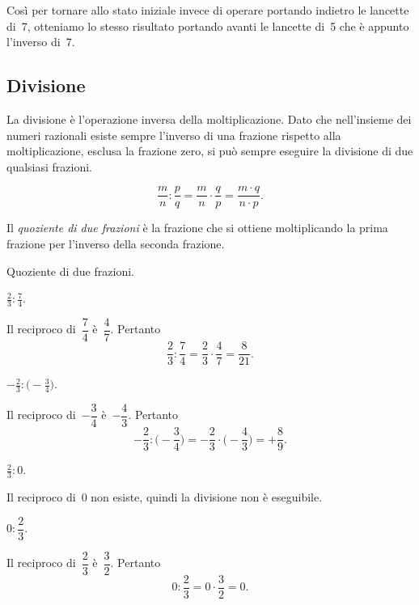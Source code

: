 Così per tornare allo stato iniziale invece di operare portando indietro le lancette di~7,
otteniamo lo stesso risultato portando avanti le lancette di~5 che è appunto l'inverso di~7.

\subsection{Divisione}

La divisione è l'operazione inversa della moltiplicazione.
Dato che nell'insieme dei numeri razionali esiste sempre l'inverso di una frazione rispetto
alla moltiplicazione, esclusa la frazione zero, si può sempre eseguire la divisione di due qualsiasi frazioni.

\begin{center}
 
\end{center}

\[\frac{m}{n}:\frac{p}{q}=\frac{m}{n}\cdot\frac{q}{p}=\frac{m\cdot q}{n\cdot p}.\]

\begin{definizione}
Il \emph{quoziente di due frazioni} è la frazione che si ottiene moltiplicando la prima frazione per l'inverso
della seconda frazione.
\end{definizione}

\begin{exrig}
 \begin{esempio}
Quoziente di due frazioni.
\begin{itemize*}
\item $\displaystyle{\frac{2}{3}:\frac{7}{4}}$.
\end{itemize*}
Il reciproco di~$\dfrac{7}{4}$ è~$\dfrac{4}{7}$. Pertanto
\[\frac{2}{3}:\frac{7}{4}=\frac{2}{3}\cdot\frac{4}{7}=\frac{8}{21}.\]

\begin{itemize*}
	\item $\displaystyle{-\frac{2}{3}:\bigg(-\frac{3}{4}\bigg)}$.
\end{itemize*}
Il reciproco di~$-\dfrac{3}{4}$ è~$-\dfrac{4}{3}$. Pertanto
\[-\frac{2}{3}:\bigg(-\frac{3}{4}\bigg)=-\frac{2}{3}\cdot\bigg(-\frac{4}{3}\bigg)=+\frac{8}{9}.\]

\begin{itemize*}
 \item $\displaystyle{\frac{2}{3}:0}$.
\end{itemize*}
 Il reciproco di~0 non esiste, quindi la divisione non è eseguibile.

\begin{itemize*}
 \item $0:\dfrac{2}{3}$.
\end{itemize*}
Il reciproco di~$\dfrac{2}{3}$ è~$\dfrac{3}{2}$. Pertanto
\[0:\frac{2}{3}=0\cdot \frac{3}{2}=0.\]
\end{esempio}
\end{exrig}

